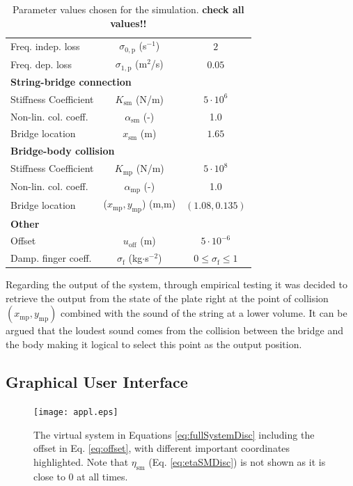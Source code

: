 \documentclass[dvipsnames, pdftex]{article}
\begin{document}
\begin{table}[t]
\begin{center}
\begin{tabular}{|l|c|c|}
    Freq. indep. loss & $\sigma_{0,\text{p}}$ (s$^{-1}$)& $2$\\
    Freq. dep. loss & $\sigma_{1,\text{p}}$ (m$^2$/s)& $0.05$\\ \hline
    \multicolumn{3}{|l|}{\bf String-bridge connection}\\\hline
    Stiffness Coefficient & $K_\text{sm}$ (N/m) & $5\cdot10^{6}$\\
    Non-lin. col. coeff. &$\alpha_\text{sm}$ (-) & 1.0\\
    Bridge location & $x_\text{sm}$ (m)& $1.65$\\
    \hline
    \multicolumn{3}{|l|}{\bf Bridge-body collision}\\\hline
    Stiffness Coefficient & $K_\text{mp}$ (N/m) & $5\cdot10^{8}$\\
    Non-lin. col. coeff. &$\alpha_\text{mp}$ (-) & 1.0\\
    Bridge location & ($x_\text{mp},y_\text{mp}$) (m,m)& $(1.08,0.135)$\\\hline
    \multicolumn{3}{|l|}{\bf Other}\\\hline
    Offset & $u_\text{off}$ (m) & $5\cdot 10^{-6}$\\
    Damp. finger coeff. &$\sigma_\text{f}$ (kg$\cdot$s$^{-2}$)&$0\leq \sigma_\text{f} \leq 1$\\
    \hline
\end{tabular}
\caption{Parameter values chosen for the simulation. \textbf{check all values!!}}
\end{center}
\end{table}
Regarding the output of the system, through empirical testing it was decided to retrieve the output from the state of the plate right at the point of collision $(x_\text{mp},y_\text{mp})$ combined with the sound of the string at a lower volume. It can be argued that the loudest sound comes from the collision between the bridge and the body making it logical to select this point as the output position. 

\subsection{Graphical User Interface}
\begin{figure}[h]
  \centering
  \texttt{[image: appl.eps]}
  \caption{The virtual system in Equations \eqref{eq:fullSystemDisc} including the offset in Eq. \eqref{eq:offset}, with different important coordinates highlighted. Note that $\eta_\text{sm}$ (Eq. \eqref{eq:etaSMDisc}) is not shown as it is close to 0 at all times. }
  \label{fig:trombaSystem}
\end{figure}
\end{document}
